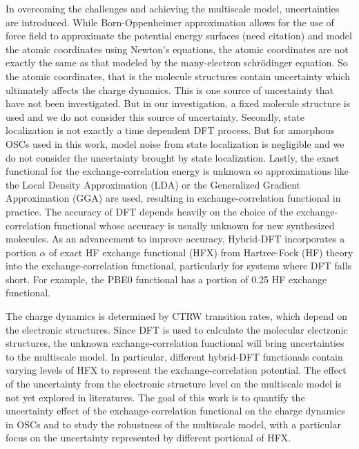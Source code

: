\documentclass[letterpaper,12pt]{article}
\begin{document}
In overcoming the challenges and achieving the multiscale model, uncertainties are introduced. 
While Born-Oppenheimer approximation allows for the use of force field to approximate the potential energy surfaces (need citation) and model the atomic coordinates using Newton’s equations, the atomic coordinates are not exactly the same as that modeled by the many-electron schr\"{o}dinger equation.
So the atomic coordinates, that is the molecule structures contain uncertainty which ultimately affects the charge dynamics. 
This is one source of uncertainty that have not been investigated.
But in our investigation, a fixed molecule structure is used and we do not consider this source of uncertainty. 
Secondly, state localization is not exactly a time dependent DFT process. 
But for amorphous OSCs used in this work, model noise from state localization is negligible and we do not consider the uncertainty brought by state localization.
Lastly, the exact functional for the exchange-correlation energy is unknown so approximations like the Local Density Approximation (LDA) or the Generalized Gradient Approximation (GGA) are used, resulting in exchange-correlation functional in practice. 
The accuracy of DFT depends heavily on the choice of the exchange-correlation functional whose accuracy is usually unknown for new synthesized molecules. 
As an advancement to improve accuracy, Hybrid-DFT incorporates a portion $\alpha$ of exact HF exchange functional (HFX) from Hartree-Fock (HF) theory into the exchange-correlation functional, particularly for systems where DFT falls short. For example, the PBE0 functional has a portion of 0.25 HF exchange functional. 

The charge dynamics is determined by CTRW transition rates, which depend on the electronic structures.
Since DFT is used to calculate the molecular electronic structures, the unknown exchange-correlation functional will bring uncertainties to the multiscale model. 
In particular, different hybrid-DFT functionals contain varying levels of HFX to represent the exchange-correlation potential. 
The effect of the uncertainty from the electronic structure level on the multiscale model is not yet explored in literatures. 
The goal of this work is to quantify the uncertainty effect of the exchange-correlation functional on the charge dynamics in OSCs and to study the robustness of the multiscale model, with a particular focus on the uncertainty represented by different portional of HFX.
\end{document}
